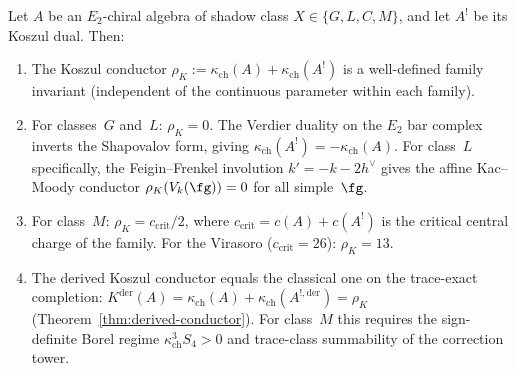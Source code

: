 \begin{theorem}
\label{thm:cy-b-conductor}
Let $A$ be an $E_2$-chiral algebra of shadow class
$X \in \{G, L, C, M\}$, and let $A^!$ be its Koszul dual. Then:
\begin{enumerate}[label=\textup{(\roman*)}]
 \item The Koszul conductor
 $\rho_K := \kappa_{\mathrm{ch}}(A) + \kappa_{\mathrm{ch}}(A^!)$
 is a well-defined family invariant (independent of the continuous
 parameter within each family).
 \item For classes~$G$ and~$L$: $\rho_K = 0$.
 The Verdier duality on the $E_2$ bar complex inverts the Shapovalov form,
 giving $\kappa_{\mathrm{ch}}(A^!) = -\kappa_{\mathrm{ch}}(A)$.
 For class~$L$ specifically, the Feigin--Frenkel involution
 $k' = -k - 2h^\vee$ gives the affine Kac--Moody conductor
 $\rho_K(V_k(\fg)) = 0$ for all simple~$\fg$.
 \item For class~$M$:
 $\rho_K = c_{\mathrm{crit}}/2$, where $c_{\mathrm{crit}} = c(A) + c(A^!)$
 is the critical central charge of the family.
 For the Virasoro ($c_{\mathrm{crit}} = 26$): $\rho_K = 13$.
 \item The derived Koszul conductor equals the classical one on the
 trace-exact completion:
 $K^{\mathrm{der}}(A) = \kappa_{\mathrm{ch}}(A) + \kappa_{\mathrm{ch}}(A^{!,\mathrm{der}}) = \rho_K$
 (Theorem~\ref{thm:derived-conductor}).
 For class~$M$ this requires the sign-definite Borel regime
 $\kappa_{\mathrm{ch}}^3S_4>0$ and trace-class summability of the
 correction tower.
\end{enumerate}
\end{theorem}

